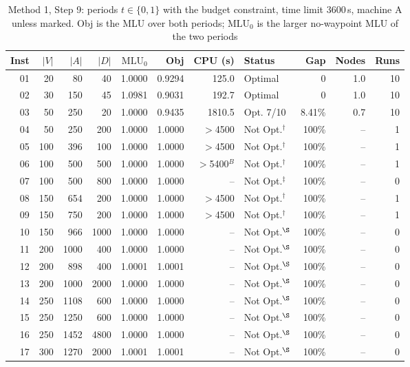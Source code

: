 \documentclass[conference]{IEEEtran}
\newcommand{\MLU}{\mathrm{MLU}}
\begin{document}
\begin{table}[t]
\centering\footnotesize
\caption{Method 1, Step 9: periods $t\in\{0,1\}$ with the budget constraint, time limit 3600\,s, machine A unless marked. Obj is the MLU over both periods; $\MLU_0$ is the larger no-waypoint MLU of the two periods}\label{tab:step9}
\begin{tabular}{@{}rrrrrrrlrrr@{}}
\toprule
Inst & $|V|$ & $|A|$ & $|D|$ & $\MLU_0$ & Obj & CPU (s) & Status & Gap & Nodes & Runs\\
\midrule
01 & 20 & 80 & 40 & 1.0000 & 0.9294 & 125.0 & Optimal & 0 & 1.0 & 10\\
02 & 30 & 150 & 45 & 1.0981 & 0.9031 & 192.7 & Optimal & 0 & 1.0 & 10\\
03 & 50 & 250 & 20 & 1.0000 & 0.9435 & 1810.5 & Opt. 7/10 & 8.41\% & 0.7 & 10\\
04 & 50 & 250 & 200 & 1.0000 & 1.0000 & $>$4500 & Not Opt.$^\dagger$ & 100\% & -- & 1\\
05 & 100 & 396 & 100 & 1.0000 & 1.0000 & $>$4500 & Not Opt.$^\dagger$ & 100\% & -- & 1\\
06 & 100 & 500 & 500 & 1.0000 & 1.0000 & $>$5400$^{B}$ & Not Opt.$^\dagger$ & 100\% & -- & 1\\
07 & 100 & 500 & 800 & 1.0000 & 1.0000 & -- & Not Opt.$^\ddagger$ & 100\% & -- & 0\\
08 & 150 & 654 & 200 & 1.0000 & 1.0000 & $>$4500 & Not Opt.$^\dagger$ & 100\% & -- & 1\\
09 & 150 & 750 & 200 & 1.0000 & 1.0000 & $>$4500 & Not Opt.$^\dagger$ & 100\% & -- & 1\\
10 & 150 & 966 & 1000 & 1.0000 & 1.0000 & -- & Not Opt.$^\S$ & 100\% & -- & 0\\
11 & 200 & 1000 & 400 & 1.0000 & 1.0000 & -- & Not Opt.$^\S$ & 100\% & -- & 0\\
12 & 200 & 898 & 400 & 1.0001 & 1.0001 & -- & Not Opt.$^\S$ & 100\% & -- & 0\\
13 & 200 & 1000 & 2000 & 1.0000 & 1.0000 & -- & Not Opt.$^\S$ & 100\% & -- & 0\\
14 & 250 & 1108 & 600 & 1.0000 & 1.0000 & -- & Not Opt.$^\S$ & 100\% & -- & 0\\
15 & 250 & 1250 & 600 & 1.0000 & 1.0000 & -- & Not Opt.$^\S$ & 100\% & -- & 0\\
16 & 250 & 1452 & 4800 & 1.0000 & 1.0000 & -- & Not Opt.$^\S$ & 100\% & -- & 0\\
17 & 300 & 1270 & 2000 & 1.0001 & 1.0001 & -- & Not Opt.$^\S$ & 100\% & -- & 0\\

\end{tabular}
\end{table}
\end{document}
